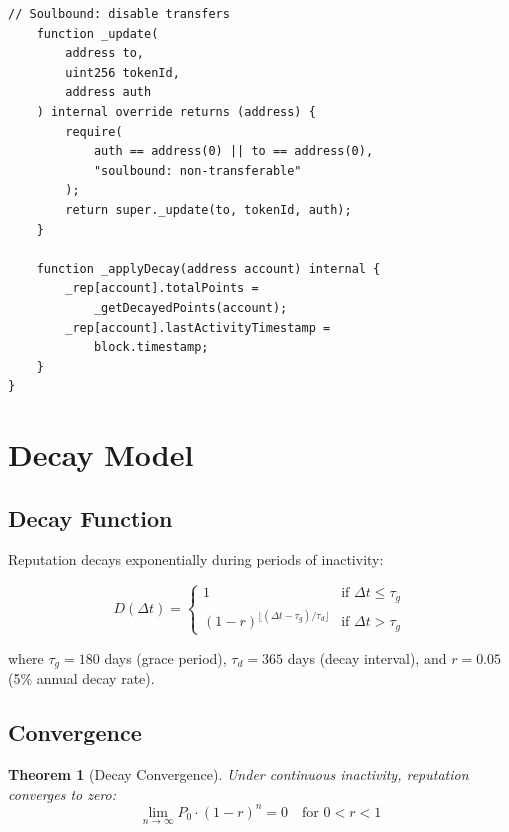 \documentclass[11pt,letterpaper]{article}
\newtheorem{theorem}{Theorem}[section]
\begin{document}
\begin{lstlisting}[language=Solidity,caption=SBTReputation contract]
    // Soulbound: disable transfers
    function _update(
        address to,
        uint256 tokenId,
        address auth
    ) internal override returns (address) {
        require(
            auth == address(0) || to == address(0),
            "soulbound: non-transferable"
        );
        return super._update(to, tokenId, auth);
    }

    function _applyDecay(address account) internal {
        _rep[account].totalPoints =
            _getDecayedPoints(account);
        _rep[account].lastActivityTimestamp =
            block.timestamp;
    }
}
\end{lstlisting}

\section{Decay Model}
\label{sec:decay}

\subsection{Decay Function}

Reputation decays exponentially during periods of inactivity:

\begin{equation}
    D(\Delta t) = \begin{cases}
        1 & \text{if } \Delta t \leq \tau_g \\
        (1 - r)^{\lfloor (\Delta t - \tau_g) / \tau_d \rfloor} & \text{if } \Delta t > \tau_g
    \end{cases}
\label{eq:decay}
\end{equation}

where $\tau_g = 180$ days (grace period), $\tau_d = 365$ days (decay interval), and $r = 0.05$ (5\% annual decay rate).

\subsection{Convergence}

\begin{theorem}[Decay Convergence]
Under continuous inactivity, reputation converges to zero:
\begin{equation}
    \lim_{n \to \infty} P_0 \cdot (1 - r)^n = 0 \quad \text{for } 0 < r < 1
\end{equation}
\end{theorem}
\end{document}
